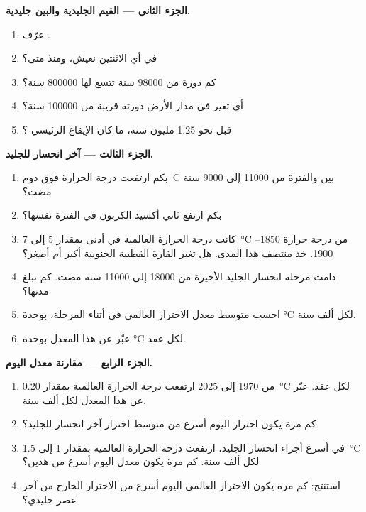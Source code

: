 \begin{problem}
\medskip
\noindent\textbf{الجزء الثاني --- القيم الجليدية والبين جليدية.}
\begin{enumerate}[resume]
  \item عرّف  .
  \item في أي الاثنتين نعيش، ومنذ متى؟
  \item كم دورة من \num{98000} سنة تتسع لها \num{800000} سنة؟
  \item أي تغير في مدار الأرض دورته قريبة من
        \num{100000} سنة؟
  \item قبل نحو 1.25 مليون سنة، ما كان الإيقاع الرئيسي
        ؟
\end{enumerate}

\medskip
\noindent\textbf{الجزء الثالث --- آخر انحسار للجليد.}
\begin{enumerate}[resume]
  \item بكم ارتفعت درجة الحرارة فوق دوم~C بين  والفترة من \num{11000} إلى \num{9000} سنة مضت؟
  \item بكم ارتفع ثاني أكسيد الكربون في الفترة نفسها؟
  \item كانت درجة الحرارة العالمية في  أدنى بمقدار 5 إلى
        \qty{7}{\degreeCelsius} من درجة حرارة 1850--1900. خذ منتصف
        هذا المدى. هل تغير القارة القطبية الجنوبية أكبر أم أصغر؟
  \item دامت مرحلة انحسار الجليد الأخيرة من \num{18000} إلى
        \num{11000} سنة مضت. كم تبلغ مدتها؟
  \item احسب متوسط معدل الاحترار العالمي في أثناء المرحلة، بوحدة
        \unit{\degreeCelsius} لكل ألف سنة.
  \item عبّر عن هذا المعدل بوحدة \unit{\degreeCelsius} لكل عقد.
\end{enumerate}

\medskip
\noindent\textbf{الجزء الرابع --- مقارنة معدل اليوم.}
\begin{enumerate}[resume]
  \item من 1970 إلى 2025 ارتفعت درجة الحرارة العالمية بمقدار
        \qty{0.20}{\degreeCelsius} لكل عقد. عبّر عن هذا المعدل لكل
        ألف سنة.
  \item كم مرة يكون احترار اليوم أسرع من متوسط احترار
        آخر انحسار للجليد؟
  \item في أسرع أجزاء انحسار الجليد، ارتفعت درجة الحرارة العالمية
        بمقدار 1 إلى \qty{1.5}{\degreeCelsius} لكل ألف سنة. كم مرة
        يكون معدل اليوم أسرع من هذين؟
  \item استنتج: كم مرة يكون الاحترار العالمي اليوم أسرع من الاحترار الخارج من آخر
        عصر جليدي؟
\end{enumerate}
\end{problem}
